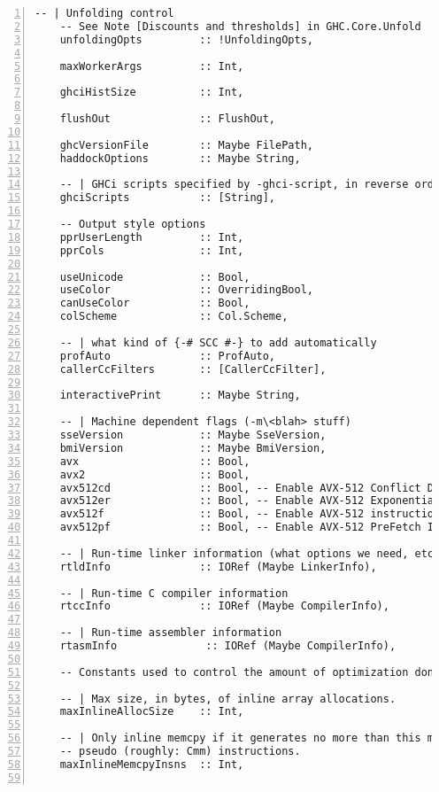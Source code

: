 \documentclass[en]{pracamgr}
\begin{document}
\begin{lstlisting}[numbers=left,stepnumber=1]
    -- | Unfolding control
    -- See Note [Discounts and thresholds] in GHC.Core.Unfold
    unfoldingOpts         :: !UnfoldingOpts,
  
    maxWorkerArgs         :: Int,
  
    ghciHistSize          :: Int,
  
    flushOut              :: FlushOut,
  
    ghcVersionFile        :: Maybe FilePath,
    haddockOptions        :: Maybe String,
  
    -- | GHCi scripts specified by -ghci-script, in reverse order
    ghciScripts           :: [String],
  
    -- Output style options
    pprUserLength         :: Int,
    pprCols               :: Int,
  
    useUnicode            :: Bool,
    useColor              :: OverridingBool,
    canUseColor           :: Bool,
    colScheme             :: Col.Scheme,
  
    -- | what kind of {-# SCC #-} to add automatically
    profAuto              :: ProfAuto,
    callerCcFilters       :: [CallerCcFilter],
  
    interactivePrint      :: Maybe String,
  
    -- | Machine dependent flags (-m\<blah> stuff)
    sseVersion            :: Maybe SseVersion,
    bmiVersion            :: Maybe BmiVersion,
    avx                   :: Bool,
    avx2                  :: Bool,
    avx512cd              :: Bool, -- Enable AVX-512 Conflict Detection Instructions.
    avx512er              :: Bool, -- Enable AVX-512 Exponential and Reciprocal Instructions.
    avx512f               :: Bool, -- Enable AVX-512 instructions.
    avx512pf              :: Bool, -- Enable AVX-512 PreFetch Instructions.
  
    -- | Run-time linker information (what options we need, etc.)
    rtldInfo              :: IORef (Maybe LinkerInfo),
  
    -- | Run-time C compiler information
    rtccInfo              :: IORef (Maybe CompilerInfo),
  
    -- | Run-time assembler information
    rtasmInfo              :: IORef (Maybe CompilerInfo),
  
    -- Constants used to control the amount of optimization done.
  
    -- | Max size, in bytes, of inline array allocations.
    maxInlineAllocSize    :: Int,
  
    -- | Only inline memcpy if it generates no more than this many
    -- pseudo (roughly: Cmm) instructions.
    maxInlineMemcpyInsns  :: Int,
  

\end{lstlisting}
\end{document}
